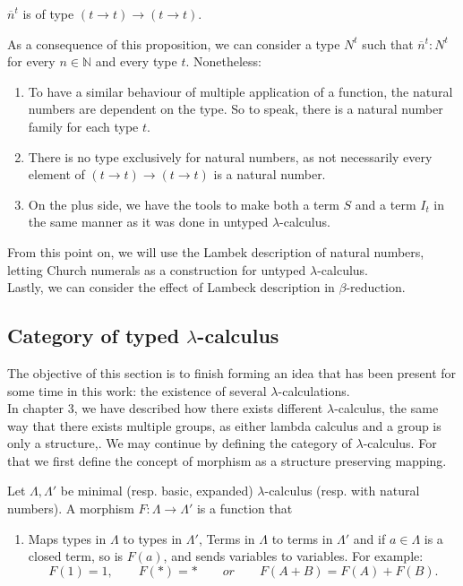 \begin{definition}
\begin{definition}
\end{definition}

\begin{remark}
  $\overline n^t$ is of type $(t\to t)\to(t\to t)$.
\end{remark}

As a consequence of this proposition, we can consider a type $N^t$ such that $\overline n^t:N^t$ for every $n\in\mathbb{N}$ and every type $t$. Nonetheless:
\begin{enumerate}

\item To have a similar behaviour of multiple application of a function, the natural numbers are dependent on the type. So to speak, there is a natural number family for each type $t$.
\item There is no type exclusively for natural numbers, as not necessarily every element of $(t\to t)\to(t\to t)$ is a natural number.
\item On the plus side, we have the tools to make both a term $S$ and a term $I_t$ in the same manner as it was done in untyped $\lambda$-calculus. \\
\end{enumerate}
From this point on, we will use the Lambek description of natural numbers, letting Church numerals as a construction for untyped $\lambda$-calculus.\\

Lastly, we can consider the effect of Lambeck description in $\beta$-reduction.

\subsection{Category of typed $\lambda$-calculus}

The objective of this section is to finish forming an idea that has been present for some time in this work: the existence of several $\lambda$-calculations. \\

In chapter 3, we have described how there exists different $\lambda$-calculus, the same way that there exists multiple groups, as either lambda calculus and a group is only a structure,. We may continue by defining the category of $\lambda$-calculus. For that we first define the concept of morphism as a structure preserving mapping.



\begin{definition}
  Let $\Lambda, \Lambda '$ be minimal (resp. basic, expanded) $\lambda$-calculus (resp. with natural numbers). A morphism $F: \Lambda \to \Lambda '$ is a function that
  \begin{enumerate}
  \item Maps types in $\Lambda$ to types in $\Lambda '$, Terms in $\Lambda$ to terms in $\Lambda '$ and if $a\in \Lambda$ is a closed term, so is $F(a)$, and sends variables to variables. For example: $$F(1) = 1, \qquad F(*) = * \qquad or \qquad F(A+B) =F(A)+F(B).$$
    

\end{enumerate}
\end{definition}
\end{definition}
